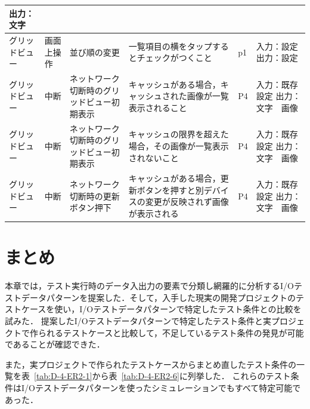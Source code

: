 \begin{table}[htbp]
\begin{tabular}{|p{8em}|p{7em}|p{9em}|p{9em}|p{3em}|p{12em}|}
出力：文字 \bigstrut\\
    \hline
    \multicolumn{1}{|l|}{グリッドビュー} & 画面上操作 & 並び順の変更 & 一覧項目の横をタップするとチェックがつくこと & p1    & 入力：設定
出力：設定 \bigstrut\\
    \hline
    グリッドビュー & 中断    & ネットワーク切断時のグリッドビュー初期表示 & キャッシュがある場合，キャッシュされた画像が一覧表示されること & P4    & 入力：既存設定
出力：文字　画像 \bigstrut\\
    \hline
    グリッドビュー & 中断    & ネットワーク切断時のグリッドビュー初期表示 & キャッシュの限界を超えた場合，その画像が一覧表示されないこと & P4    & 入力：既存設定
出力：文字　画像 \bigstrut\\
    \hline
    グリッドビュー & 中断    & ネットワーク切断時の更新ボタン押下 & キャッシュがある場合，更新ボタンを押すと別デバイスの変更が反映されず画像が表示される & P4    & 入力：既存設定
出力：文字　画像 \bigstrut\\
    \hline
    \end{tabular}%
    \label{tab:D-4-ER-4}%
  \end{table}%

  \newpage
  \section{まとめ}
  本章では，テスト実行時のデータ入出力の要素で分類し網羅的に分析するI/Oテストデータパターンを提案した．そして，入手した現実の開発プロジェクトのテストケースを使い，I/Oテストデータパターンで特定したテスト条件との比較を試みた．
  提案したI/Oテストデータパターンで特定したテスト条件と実プロジェクトで作られるテストケースと比較して，不足しているテスト条件の発見が可能であることが確認できた．

  また，実プロジェクトで作られたテストケースからまとめ直したテスト条件の一覧を表~\ref{tab:D-4-ER2-1}から表~\ref{tab:D-4-ER2-6}に列挙した．
  これらのテスト条件はI/Oテストデータパターンを使ったシミュレーションでもすべて特定可能であった．


